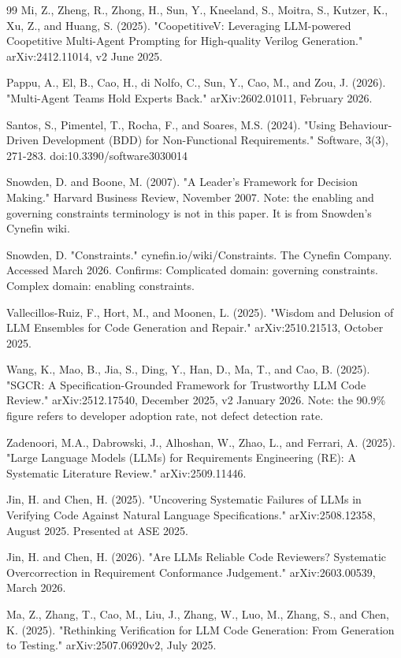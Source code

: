 \documentclass{article}
\begin{document}
\begin{thebibliography}{99}
Mi, Z., Zheng, R., Zhong, H., Sun, Y., Kneeland, S., Moitra, S., Kutzer,
K., Xu, Z., and Huang, S. (2025). "CoopetitiveV: Leveraging LLM-powered
Coopetitive Multi-Agent Prompting for High-quality Verilog Generation."
arXiv:2412.11014, v2 June 2025.

Pappu, A., El, B., Cao, H., di Nolfo, C., Sun, Y., Cao, M., and Zou, J.
(2026). "Multi-Agent Teams Hold Experts Back." arXiv:2602.01011, February
2026.

Santos, S., Pimentel, T., Rocha, F., and Soares, M.S. (2024). "Using
Behaviour-Driven Development (BDD) for Non-Functional Requirements."
Software, 3(3), 271-283. doi:10.3390/software3030014

Snowden, D. and Boone, M. (2007). "A Leader's Framework for Decision
Making." Harvard Business Review, November 2007. Note: the enabling
and governing constraints terminology is not in this paper. It is
from Snowden's Cynefin wiki.

Snowden, D. "Constraints." cynefin.io/wiki/Constraints.
The Cynefin Company. Accessed March 2026. Confirms: Complicated domain:
governing constraints. Complex domain: enabling constraints.

Vallecillos-Ruiz, F., Hort, M., and Moonen, L. (2025). "Wisdom and
Delusion of LLM Ensembles for Code Generation and Repair."
arXiv:2510.21513, October 2025.

Wang, K., Mao, B., Jia, S., Ding, Y., Han, D., Ma, T., and Cao, B.
(2025). "SGCR: A Specification-Grounded Framework for Trustworthy LLM
Code Review." arXiv:2512.17540, December 2025, v2 January 2026.
Note: the 90.9\% figure refers to developer adoption rate, not defect
detection rate.

Zadenoori, M.A., Dabrowski, J., Alhoshan, W., Zhao, L., and Ferrari, A.
(2025). "Large Language Models (LLMs) for Requirements Engineering (RE):
A Systematic Literature Review." arXiv:2509.11446.

Jin, H. and Chen, H. (2025). "Uncovering Systematic Failures of LLMs in
Verifying Code Against Natural Language Specifications."
arXiv:2508.12358, August 2025. Presented at ASE 2025.

Jin, H. and Chen, H. (2026). "Are LLMs Reliable Code Reviewers? Systematic
Overcorrection in Requirement Conformance Judgement."
arXiv:2603.00539, March 2026.

Ma, Z., Zhang, T., Cao, M., Liu, J., Zhang, W., Luo, M., Zhang, S., and Chen, K.
(2025). "Rethinking Verification for LLM Code Generation: From Generation to
Testing." arXiv:2507.06920v2, July 2025.

\end{thebibliography}
\end{document}
